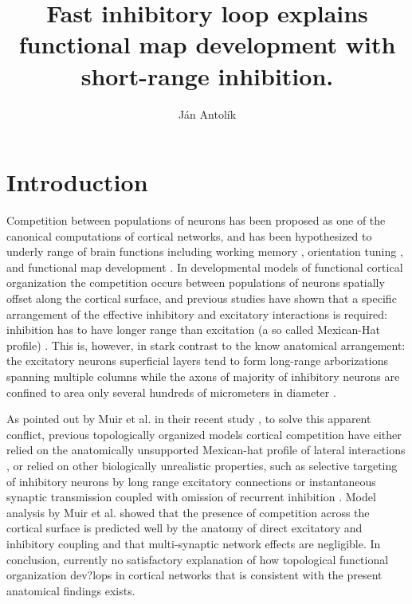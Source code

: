 \documentclass[a4paper,10pt]{article}
\title{Fast inhibitory loop explains functional map development with short-range inhibition.}
\author{J\'an Antol\'ik}
\begin{document}
 \maketitle
{}


\section{Introduction}

Competition between populations of neurons has been proposed as one of the canonical computations of cortical 
networks, and has been hypothesized to underly range of brain functions including working memory \cite{Amit1995,Durstewitz2000},
orientation tuning \cite{Somers1995,Ben-Yishai1995}, and functional map development \cite{VonderMalsburg1973,Antolik2011}.
In developmental models of functional cortical organization the competition occurs between populations of neurons spatially offset 
along the cortical surface, and previous studies have shown that a specific arrangement of the effective inhibitory and excitatory 
interactions is required: inhibition has to have longer range than excitation (a so called Mexican-Hat profile) \cite{Muir2014}.
This is, however, in stark contrast to the know anatomical arrangement: the excitatory neurons superficial layers tend to form 
long-range arborizations spanning multiple columns while the axons of majority of inhibitory neurons are confined to area
only several hundreds of micrometers in diameter \cite{Buzas2006,Budd2001}.


As pointed out by Muir et al. in their recent study \cite{Muir2014}, to solve this apparent conflict, previous topologically organized models cortical competition have either relied on the anatomically unsupported Mexican-hat profile of lateral interactions \cite{VonderMalsburg1973,CMVC}, or relied on other biologically unrealistic properties, such as selective targeting of inhibitory neurons by long range excitatory connections \cite{law:phd09,Rutishauser2012} or instantaneous synaptic transmission coupled with omission of recurrent inhibition \cite{Kang2003,Levy2011}. Model analysis by Muir et al. \cite{Muir2014} showed that the presence of competition across the cortical surface is predicted well by the anatomy of direct excitatory and inhibitory coupling and that multi-synaptic network effects are negligible. In conclusion, currently no satisfactory explanation of how topological functional organization dev?lops in cortical networks that is consistent with the present anatomical findings exists. 
\end{document}
